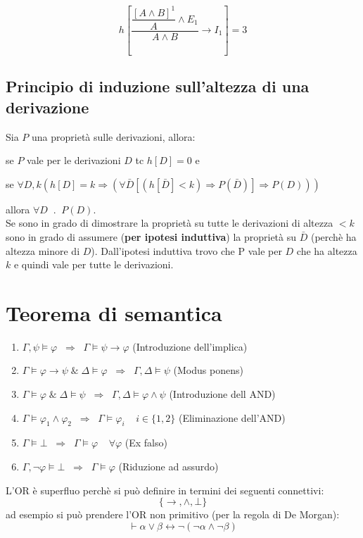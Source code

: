 \documentclass{article}
\theoremstyle{break}
\theoremstyle{break}
\theoremstyle{break}
\theoremstyle{break}
\begin{document}
\begin{exercise}
  \[
    h\left[ \dfrac{\dfrac{[A \wedge B]^1}{A}\wedge E_1}{A \wedge B} \to I_1 \right] = 3
  \] 
\end{exercise}

\subsection{Principio di induzione sull'altezza di una derivazione}
Sia \( P \) una proprietà sulle derivazioni, allora:

se \( P \) vale per le derivazioni \( D \) tc \( h[D]=0 \) e

se \( \forall D,k (h[D]=k \Rightarrow (\forall \bar{D}[(h[\bar{D}]<k) \Rightarrow P(\bar{D})] \Rightarrow P(D))) \)

allora \( \forall D\;\; . \;\; P(D) \).\\
Se sono in grado di dimostrare la proprietà su tutte le derivazioni di altezza \( <k \)
sono in grado di assumere (\textbf{per ipotesi induttiva}) la proprietà su \( \bar{D} \)
(perchè ha altezza minore di \( D \)). Dall'ipotesi induttiva trovo che P vale per
\( D \) che ha altezza \( k \) e quindi vale per tutte le derivazioni.


\section{Teorema di semantica}
\begin{enumerate}
  \item \( \Gamma,\psi \models \varphi\;\; \Rightarrow\;\; \Gamma \models \psi \to \varphi \) (Introduzione dell'implica)
  \item \( \Gamma \models \varphi \to \psi \;\&\; \Delta \models \varphi \;\;\Rightarrow\;\; \Gamma,\Delta \models \psi \) (Modus ponens)
  \item \( \Gamma \models \varphi \;\&\; \Delta \models \psi \;\;\Rightarrow\;\; \Gamma,\Delta \models \varphi \wedge \psi \) (Introduzione dell AND)
  \item \( \Gamma \models \varphi_1 \wedge \varphi_2 \;\;\Rightarrow\;\; \Gamma \models \varphi_i \;\;\;\; i \in \{1,2\}  \) (Eliminazione dell'AND)
  \item \( \Gamma \models \bot \;\;\Rightarrow\;\; \Gamma \models \varphi \;\;\;\; \forall \varphi \) (Ex falso)
  \item \( \Gamma, \neg \varphi \models \bot \;\;\Rightarrow\;\; \Gamma \models \varphi \) (Riduzione ad assurdo)
\end{enumerate}
L'OR è superfluo perchè si può definire in termini dei seguenti connettivi:
\[
  \{\to , \wedge, \bot\} 
\] 
ad esempio si può prendere l'OR non primitivo (per la regola di De Morgan): \[ \vdash \alpha \vee \beta \leftrightarrow \neg(\neg \alpha \wedge \neg \beta) \] 
\end{document}

